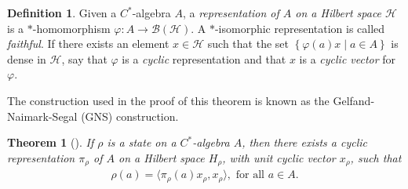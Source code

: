 \documentclass[11pt,a4paper]{report}
\theoremstyle{plain}
\newtheorem{thm}{Theorem}
\theoremstyle{definition}
\newtheorem*{defn}{Definition}
\newcommand{\1}{\mathbbm{1}}
\renewcommand{\H}{\mathcal{H}}
\newcommand{\B}{\mathcal{B}}
\newcommand{\BH}{\mathcal{\B(\H)}}
\renewcommand{\phi}{\varphi}
\begin{document}
\begin{defn}
	Given a $C^\ast$-algebra $A$, a \emph{representation of $A$ on a Hilbert space 
	$\H$} is a $\ast$-homomorphism $\phi: A \to \BH$. A $\ast$-isomorphic 
	representation is called \emph{faithful}. If there exists an element $x\in\H$ 
	such that the set $\left\{\phi(a)x \mid a\in A\right\}$ is dense in $\H$, say 
	that $\phi$ is a \emph{cyclic} representation and that $x$ is a 
	\emph{cyclic vector} for $\phi$.
\end{defn}	

The construction used in the proof of this theorem is known as the 
Gelfand-Naimark-Segal (GNS) construction.

\begin{thm}[{\cite[4.5.2]{kadison83}}]\label{thm:gns}
	If $\rho$ is a state on a $C^\ast$-algebra $A$, then there exists a cyclic 
	representation $\pi_\rho$ of $A$ on a Hilbert space ${H}_\rho$, with unit cyclic 
	vector $x_\rho$, such that 
	\begin{align*} 
		\rho(a)= \langle \pi_\rho (a) x_\rho, x_\rho \rangle,  \mbox{ for all } a \in A.
	\end{align*}
\end{thm}
\end{document}
